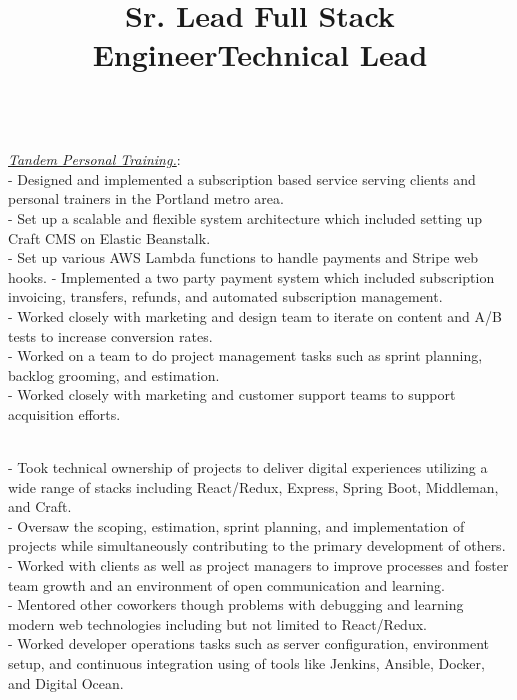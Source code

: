 \documentclass[margin]{res}
\begin{document}
\begin{resume}
\title{\textbf{Sr. Lead Full Stack Engineer}}

\begin{position}\\
\textit{\href{https://traintandem.com}{Tandem Personal Training.}}:\\
- Designed and implemented a subscription based service serving clients and personal trainers in the Portland metro area.\\
- Set up a scalable and flexible system architecture which included setting up Craft CMS on Elastic Beanstalk.\\
- Set up various AWS Lambda functions to handle payments and Stripe web hooks. 
- Implemented a two party payment system which included subscription invoicing, transfers, refunds, and automated subscription management.\\
- Worked closely with marketing and design team to iterate on content and A/B tests to increase conversion rates.\\
- Worked on a team to do project management tasks such as sprint planning, backlog grooming, and estimation.\\
- Worked closely with marketing and customer support teams to support acquisition efforts.

\end{position}


\title{\textbf{Technical Lead}}

\begin{position}\\
- Took technical ownership of projects to deliver digital experiences utilizing a wide range of stacks including React/Redux, Express, Spring Boot,  Middleman, and Craft.\\
- Oversaw the scoping, estimation, sprint planning, and implementation of projects while simultaneously contributing to the primary development of others.\\
- Worked with clients as well as project managers to improve processes and foster team growth and an environment of open communication and learning.\\
- Mentored other coworkers though problems with debugging and learning modern web technologies including but not limited to React/Redux.\\
- Worked developer operations tasks such as server configuration, environment setup,  and continuous integration using of tools like Jenkins, Ansible, Docker, and Digital Ocean.


\end{position}
\end{resume}
\end{document}
